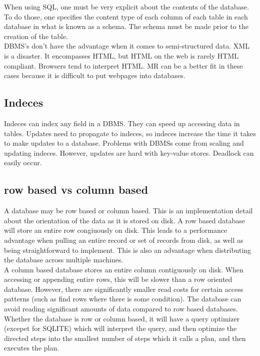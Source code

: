 \documentclass[twoside]{article}
\begin{document}
When using SQL, one must be very explicit about the contents of the database. To do those, one specifies the content type of each column of each table in each database in what is known as a schema. The schema must be made prior to the creation of the table. \\

DBMS's don't have the advantage when it comes to semi-structured data. XML is a disaster. It encompasses HTML, but HTML on the web is rarely HTML compliant. Browsers tend to interpret HTML. MR can be a better fit in these cases because it is difficult to put webpages into databases.\\

\subsection{Indeces}
Indeces can index any field in a DBMS. They can speed up accessing data in tables. Updates need to propagate to indeces, so indeces increase the time it takes to make updates to a database. Problems with DBMSs come from scaling and updating indeces. However, updates are hard with key-value stores. Deadlock can easily occur. 

\subsection{row based vs column based}
A database may be row based or column based. This is an implementation detail about the orientation of the data as it is stored on disk. A row based database will store an entire row congiuously on disk. This leads to a performance advantage when pulling an entire record or set of records from disk, as well as being straightforward to implement. This is also an advantage when distributing the database across multiple machines.\\
A column based database stores an entire column contiguously on disk. When accessing or appending entire rows, this will be slower than a row oriented database. However, there are significantly smaller read costs for certain access patterns (such as find rows where there is some condition). The database can avoid reading significant amounts of data compared to row based databases.\\ Whether the database is row or column based, it will have a query optimizer (excepet for SQLITE) which will interpret the query, and then optimize the directed steps into the smallest number of steps which it calls a plan, and then executes the plan.\\
\end{document}
